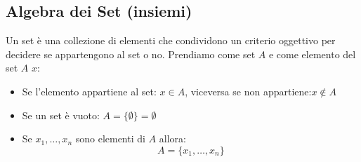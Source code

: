     \subsection{Algebra dei Set (insiemi)}
        Un set è una collezione di elementi che condividono un criterio oggettivo per decidere se appartengono al set o no. Prendiamo come set $A$ e come 
        elemento del set $A$ $x$:
        \begin{itemize}
            \item {Se l'elemento appartiene al set: $x\in A$, viceversa se non appartiene:$x\notin A$}
            \item {Se un set è vuoto: $A=\{\emptyset\}=\emptyset$}
            \item {Se $x_1, \dots, x_n$ sono elementi di $A$ allora:
                \[
                    A=\{x_1, \dots, x_n \}
                \]
            }
        \end{itemize}
